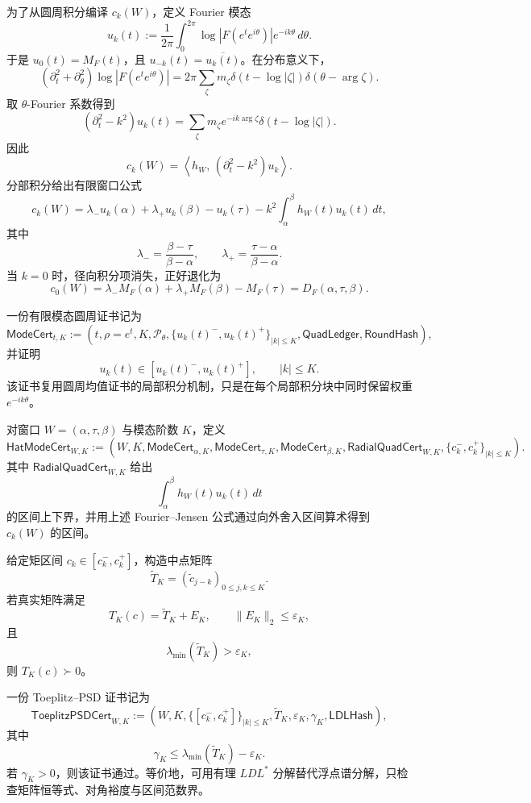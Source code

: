 为了从圆周积分编译 \(c_k(W)\)，定义 Fourier 模态
\[
u_k(t)
:=
\frac1{2\pi}
\int_0^{2\pi}
\log|F(e^te^{i\theta})|e^{-ik\theta}\,d\theta.
\]
于是 \(u_0(t)=M_F(t)\)，且 \(u_{-k}(t)=\overline{u_k(t)}\)。在分布意义下，
\[
(\partial_t^2+\partial_\theta^2)
\log|F(e^te^{i\theta})|
=
2\pi
\sum_\zeta
m_\zeta
\delta(t-\log|\zeta|)
\delta(\theta-\arg\zeta).
\]
取 \(\theta\)-Fourier 系数得到
\[
(\partial_t^2-k^2)u_k(t)
=
\sum_\zeta
m_\zeta e^{-ik\arg\zeta}
\delta(t-\log|\zeta|).
\]
因此
\[
c_k(W)=
\left\langle
h_W,\,
(\partial_t^2-k^2)u_k
\right\rangle.
\]
分部积分给出有限窗口公式
\[
c_k(W)
=
\lambda_-u_k(\alpha)
+
\lambda_+u_k(\beta)
-
u_k(\tau)
-
k^2\int_\alpha^\beta h_W(t)u_k(t)\,dt,
\]
其中
\[
\lambda_-=\frac{\beta-\tau}{\beta-\alpha},
\qquad
\lambda_+=\frac{\tau-\alpha}{\beta-\alpha}.
\]
当 \(k=0\) 时，径向积分项消失，正好退化为
\[
c_0(W)
=
\lambda_-M_F(\alpha)
+
\lambda_+M_F(\beta)
-
M_F(\tau)
=
D_F(\alpha,\tau,\beta).
\]

\begin{definition}[有限模态圆周证书]\label{def:typed-address-biaxial-completion-mode-certificate}
一份有限模态圆周证书记为
\[
\mathsf{ModeCert}_{t,K}
:=
\left(
t,\rho=e^t,K,
\mathcal P_\theta,
\{u_k(t)^-,u_k(t)^+\}_{|k|\le K},
\mathsf{QuadLedger},
\mathsf{RoundHash}
\right),
\]
并证明
\[
u_k(t)\in[u_k(t)^-,u_k(t)^+],
\qquad
|k|\le K.
\]
该证书复用圆周均值证书的局部积分机制，只是在每个局部积分块中同时保留权重 \(e^{-ik\theta}\)。
\end{definition}

\begin{definition}\label{def:typed-address-biaxial-completion-hat-mode-certificate}
对窗口 \(W=(\alpha,\tau,\beta)\) 与模态阶数 \(K\)，定义
\[
\mathsf{HatModeCert}_{W,K}
:=
\left(
W,K,
\mathsf{ModeCert}_{\alpha,K},
\mathsf{ModeCert}_{\tau,K},
\mathsf{ModeCert}_{\beta,K},
\mathsf{RadialQuadCert}_{W,K},
\{c_k^-,c_k^+\}_{|k|\le K}
\right).
\]
其中 \(\mathsf{RadialQuadCert}_{W,K}\) 给出
\[
\int_\alpha^\beta h_W(t)u_k(t)\,dt
\]
的区间上下界，并用上述 Fourier--Jensen 公式通过向外舍入区间算术得到 \(c_k(W)\) 的区间。
\end{definition}

给定矩区间 \(c_k\in[c_k^-,c_k^+]\)，构造中点矩阵
\[
\widetilde T_K=(\widetilde c_{j-k})_{0\le j,k\le K}.
\]
若真实矩阵满足
\[
T_K(c)=\widetilde T_K+E_K,
\qquad
\|E_K\|_2\le\varepsilon_K,
\]
且
\[
\lambda_{\min}(\widetilde T_K)>\varepsilon_K,
\]
则 \(T_K(c)\succ0\)。

\begin{definition}\label{def:typed-address-biaxial-completion-toeplitz-psd-certificate}
一份 Toeplitz--PSD 证书记为
\[
\mathsf{ToeplitzPSDCert}_{W,K}
:=
\left(
W,K,
\{[c_k^-,c_k^+]\}_{|k|\le K},
\widetilde T_K,
\varepsilon_K,
\gamma_K,
\mathsf{LDLHash}
\right),
\]
其中
\[
\gamma_K\le
\lambda_{\min}(\widetilde T_K)-\varepsilon_K.
\]
若 \(\gamma_K>0\)，则该证书通过。等价地，可用有理 \(LDL^*\) 分解替代浮点谱分解，只检查矩阵恒等式、对角裕度与区间范数界。
\end{definition}

